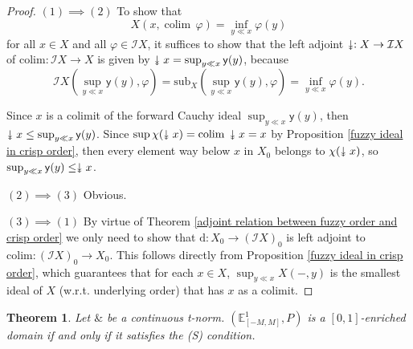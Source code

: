 \documentclass[preprint,3p,times]{elsarticle}
\theoremstyle{plain}
\newtheorem{thm}{Theorem}[section]
\theoremstyle{definition}
\newcommand{\twoheaddownarrow}{\mathrel{\rotatebox[origin=c]{-90}{$\twoheadrightarrow$}}}
\renewcommand{\phi}{\varphi}
\numberwithin{equation}{section}
\begin{document}
\begin{proof}
$(1) \implies(2)$  To show that
\[
X(x, \operatorname{colim}\,\phi) = \inf_{y \ll x} \phi(y)
\]
for all $x \in X$ and all $\phi \in \mathcal{I}X$, it suffices to show that the left adjoint $\twoheaddownarrow: X \to \mathcal{I}X$ of $\mathrm{colim}: \mathcal{I}X \to X$ is given by $\twoheaddownarrow x = \sup_{y \ll x} \mathsf{y}(y)$, because
\[
\mathcal{I}X\left( \sup_{y \ll x} \mathsf{y}(y), \phi \right) = \mathrm{sub}_X\left( \sup_{y \ll x} \mathsf{y}(y), \phi \right) = \inf_{y \ll x} \phi(y).
\]

Since $x$ is a colimit of the forward Cauchy ideal $\sup_{y \ll x} \mathsf{y}(y)$, then $\twoheaddownarrow x \leq \sup_{y \ll x} \mathsf{y}(y)$. Since $\sup \chi(\twoheaddownarrow x) =  \mathrm{colim}\,\twoheaddownarrow x = x$ by Proposition \ref{fuzzy ideal in crisp order}, then every element way below $x$ in $X_0$ belongs to $\chi(\twoheaddownarrow x)$, so $\sup_{y \ll x} \mathsf{y}(y) \leq \twoheaddownarrow x$.

$(2)\implies(3)$ Obvious.

$(3)\implies(1)$ By virtue of Theorem \ref{adjoint relation between fuzzy order and crisp order} we only need to show that $\mathrm{d}: X_0 \to (\mathcal{I}X)_0$ is left adjoint to $\mathrm{colim}: (\mathcal{I}X)_0 \to X_0$. This follows directly from Proposition \ref{fuzzy ideal in crisp order}, which guarantees that for each $x \in X$, $\sup_{y \ll x} X(-, y)$ is the smallest ideal of $X$ (w.r.t. underlying order) that has $x$ as a colimit.
\end{proof}


\begin{thm}
  Let \( \& \) be a continuous t-norm. \((\mathbb{E}^1_{[-M,M]},P)\) is a \([0,1]\)-enriched domain if and  only if it satisfies  the (S) condition.  
\end{thm}
\end{document}
